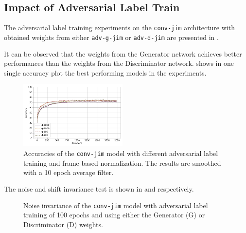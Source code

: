 \subsection{Impact of Adversarial Label Train}\label{sec:exp_adv_label}
The adversarial label training experiments on the \texttt{conv-jim} architecture with obtained weights from either \texttt{adv-g-jim} or \texttt{adv-d-jim} are presented in .

It can be observed that the weights from the Generator network achieves better performances than the weights from the Discriminator network.
 shows in one single accuracy plot the best performing models in the experiments.
\begin{figure}[!ht]
  \centering
  \includegraphics[width=0.48\textwidth]{./5_exp/figs/exp_adv_label_acc_conv-jim.png}
  \caption{Accuracies of the \texttt{conv-jim} model with different adversarial label training and frame-based normalization. The results are smoothed with a 10 epoch average filter.}
  \label{fig:exp_adv_label_acc_conv-jim}
\end{figure}
\FloatBarrier
\noindent
The noise and shift invariance test is shown in  and  respectively.
\begin{figure}[!ht]
  \centering
  \qquad
  \caption{Noise invariance of the \texttt{conv-jim} model with adversarial label training of 100 epochs and using either the Generator (G) or Discriminator (D) weights.}
  \label{fig:exp_adv_label_tb_noise_conv-jim}
\end{figure}
